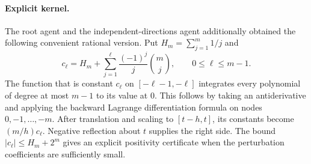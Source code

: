 \documentclass[11pt]{article}
\begin{document}
\paragraph{Explicit kernel.}
The root agent and the independent-directions agent additionally obtained
the following convenient rational version. Put $H_m=\sum_{j=1}^m1/j$ and
\[
 c_\ell=H_m+\sum_{j=1}^{\ell}\frac{(-1)^j}{j}\binom mj,
 \qquad0\le\ell\le m-1.
\]
The function that is constant $c_\ell$ on
$[-\ell-1,-\ell]$ integrates every polynomial of degree at most $m-1$
to its value at $0$. This follows by taking an antiderivative and applying
the backward Lagrange differentiation formula on nodes $0,-1,\ldots,-m$.
After translation and scaling to $[t-h,t]$, its constants become
$(m/h)c_\ell$. Negative reflection about $t$ supplies the right side.
The bound $|c_\ell|\le H_m+2^m$ gives an explicit positivity certificate
when the perturbation coefficients are sufficiently small.
\end{document}
